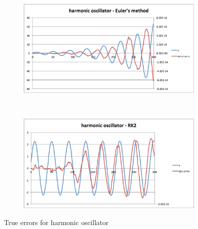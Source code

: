 \documentclass[10pt]{article}
\begin{document}
\begin{figure}[h!]
  \centering
\begin{subfigure}[b]{0.45\textwidth}
\includegraphics[width=\textwidth]{images/harmonic_euler}
\end{subfigure}%
~ %
\begin{subfigure}[b]{0.45\textwidth}
\includegraphics[width=\textwidth]{images/harmonic_rk2}
\end{subfigure}
\caption{True errors for harmonic oscillator}
\label{fig:harmonic}
\end{figure}
\end{document}
